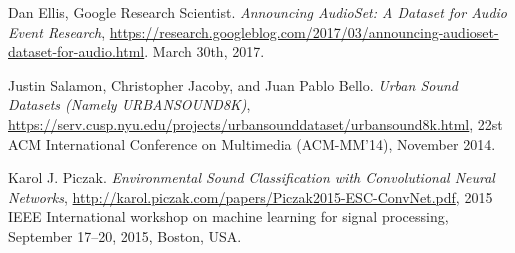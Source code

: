 \documentclass[times,12pt]{article}    %
\begin{document}
\begin{thebibliography}{9}
Dan Ellis, Google Research Scientist.
\textit{Announcing AudioSet: A Dataset for Audio Event Research},
\url{https://research.googleblog.com/2017/03/announcing-audioset-dataset-for-audio.html}. 
March 30th, 2017.
 
Justin Salamon, Christopher Jacoby, and Juan Pablo Bello.
\textit{Urban Sound Datasets (Namely URBANSOUND8K)},
\url{https://serv.cusp.nyu.edu/projects/urbansounddataset/urbansound8k.html}, 
22st {ACM} International Conference on Multimedia ({ACM-MM'14}), November 2014.
 
Karol J. Piczak.
\textit{Environmental Sound Classification with Convolutional Neural Networks},
\url{http://karol.piczak.com/papers/Piczak2015-ESC-ConvNet.pdf}, 
2015 IEEE International workshop on machine learning for signal processing, September 17–20, 2015, Boston, USA.

\end{thebibliography}
\end{document}
